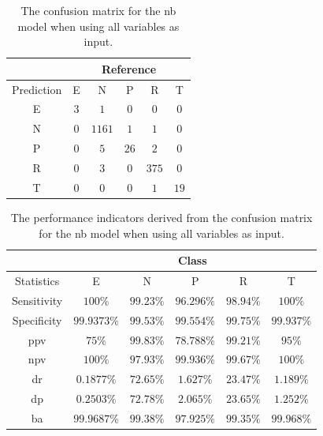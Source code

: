 \documentclass[sn-mathphys-num]{sn-jnl}%
\begin{document}
\begin{table}[!ht]
    \centering
    \caption{The confusion matrix for the \acrlong{nb} model when using all variables as input.}
	\label{tab:cm:all:nb}
	\begin{tabular}{|c|c|c|c|c|c|}
		\hline
		 & \multicolumn{5}{|c|}{Reference} \\ \hline
		 Prediction & E & N & P & R & T \\ \hline
		 E & $3$ & $1$ & $0$ & $0$ & $0$ \\ \hline
		 N & $0$ & $1161$ & $1$ & $1$ & $0$ \\ \hline
		 P & $0$ & $5$ & $26$ & $2$ & $0$ \\ \hline
		 R & $0$ & $3$ & $0$ & $375$ & $0$ \\ \hline
		 T & $0$ & $0$ & $0$ & $1$ & $19$ \\ \hline
	\end{tabular}
\end{table}

\begin{table}[!ht]
    \centering
    \caption{The performance indicators derived from the confusion matrix for the \acrlong{nb} model when using all variables as input.}
	\label{tab:cs:reverse:all:nb}
	\begin{tabular}{|c|c|c|c|c|c|}
		\hline
		 & \multicolumn{5}{c|}{Class} \\ \hline
		Statistics & E & N & P & R & T \\ \hline
		Sensitivity & $100\%$ & $99.23\%$ & $96.296\%$ & $98.94\%$ & $100\%$ \\ \hline
		Specificity & $99.9373\%$ & $99.53\%$ & $99.554\%$ & $99.75\%$ & $99.937\%$ \\ \hline
		\acrshort{ppv} & $75\%$ & $99.83\%$ & $78.788\%$ & $99.21\%$ & $95\%$ \\ \hline
		\acrshort{npv} & $100\%$ & $97.93\%$ & $99.936\%$ & $99.67\%$ & $100\%$ \\ \hline
		\acrshort{dr} & $0.1877\%$ & $72.65\%$ & $1.627\%$ & $23.47\%$ & $1.189\%$ \\ \hline
		\acrshort{dp} & $0.2503\%$ & $72.78\%$ & $2.065\%$ & $23.65\%$ & $1.252\%$ \\ \hline
		\acrshort{ba} & $99.9687\%$ & $99.38\%$ & $97.925\%$ & $99.35\%$ & $99.968\%$ \\ \hline
	\end{tabular}
\end{table}
\end{document}
